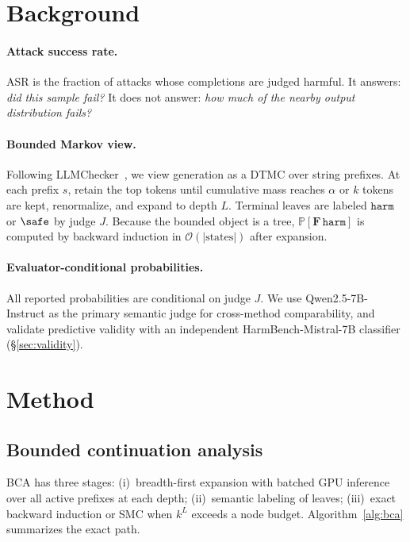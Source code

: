 \documentclass{article}
\newcommand{\Prob}{\mathbb{P}}
\newcommand{\harm}{\texttt{harm}}
\newcommand{\BCA}{\textsc{BCA}}
\newcommand{\ASR}{\textsc{ASR}}
\newcommand{\DTMC}{\textsc{DTMC}}
\newcommand{\SMC}{\textsc{SMC}}
\begin{document}
\section{Background}
\label{sec:background}

\paragraph{Attack success rate.}
\ASR{} is the fraction of attacks whose completions are judged harmful.
It answers: \emph{did this sample fail?}
It does not answer: \emph{how much of the nearby output distribution fails?}

\paragraph{Bounded Markov view.}
Following LLMChecker~\citep{gross2025llmchecker}, we view generation as a \DTMC{} over string prefixes.
At each prefix $s$, retain the top tokens until cumulative mass reaches $\alpha$ or $k$ tokens are kept, renormalize, and expand to depth $L$.
Terminal leaves are labeled $\harm$ or $\safe$ by judge $J$.
Because the bounded object is a tree, $\Prob[\mathbf{F}\,\harm]$ is computed by backward induction in $\mathcal{O}(|\text{states}|)$ after expansion.

\paragraph{Evaluator-conditional probabilities.}
All reported probabilities are conditional on judge $J$.
We use Qwen2.5-7B-Instruct as the primary semantic judge for cross-method comparability, and validate predictive validity with an independent HarmBench-Mistral-7B classifier (\S\ref{sec:validity}).

\section{Method}
\label{sec:method}

\subsection{Bounded continuation analysis}

\BCA{} has three stages: (i)~breadth-first expansion with batched GPU inference over all active prefixes at each depth; (ii)~semantic labeling of leaves; (iii)~exact backward induction or \SMC{} when $k^L$ exceeds a node budget.
Algorithm~\ref{alg:bca} summarizes the exact path.
\end{document}
